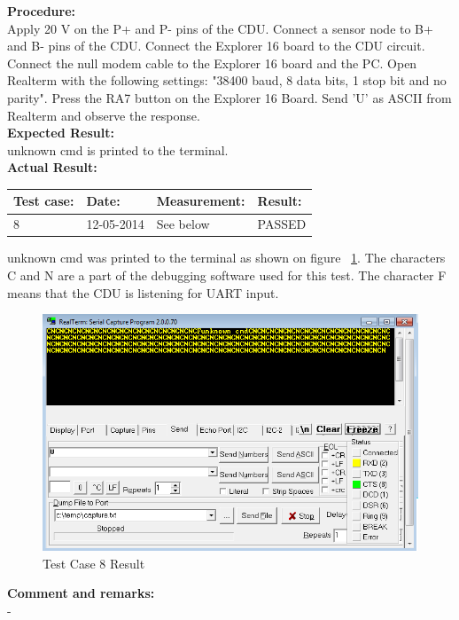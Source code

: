 \textbf{Procedure:}\\
Apply 20 V on the P+ and P- pins of the CDU. Connect a sensor node to B+ and B- pins of the CDU. Connect the Explorer 16 board to the CDU circuit. Connect the null modem cable to the Explorer 16 board and the PC. Open Realterm with the following settings: "38400 baud, 8 data bits, 1 stop bit and no parity". Press the RA7 button on the Explorer 16 Board. Send 'U' as ASCII from Realterm and observe the response.\\

\textbf{Expected Result:}\\
unknown cmd is printed to the terminal.\\

\textbf{Actual Result:}\\
\begin{table}[H]
\centering
\begin{tabular}{|p{2cm}|p{2cm}|p{3cm}|p{2cm}|}\hline
\textbf{Test case:} & \textbf{Date:} & \textbf{Measurement:} & \textbf{Result:} \\ \hline
8 & 12-05-2014 & See below & PASSED \\ \hline
\end{tabular}
\end{table}
unknown cmd was printed to the terminal as shown on figure ~\ref{fig:InteTestCase8}. The characters C and N are a part of the debugging software used for this test. The character F means that the CDU is listening for UART input.
\begin{figure}[H]
\centering
\includegraphics[width=1\textwidth]{billeder/inte08}
\caption{Test Case 8 Result}
\label{fig:InteTestCase8}
\end{figure}

\textbf{Comment and remarks:}\\
-\\

